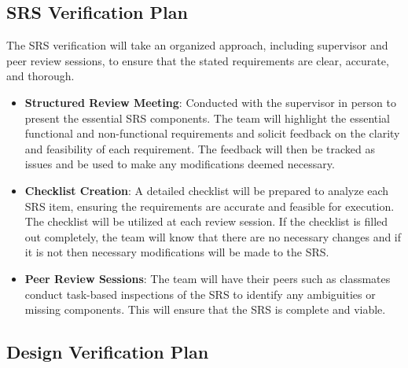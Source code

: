 \documentclass[12pt, titlepage]{article}
\begin{document}
\subsection{SRS Verification Plan}





\noindent The SRS verification will take an organized approach, including supervisor and peer review sessions, to ensure that the stated requirements are clear, accurate, and thorough. 

\begin{itemize}
    \item \textbf{Structured Review Meeting}: Conducted with the supervisor in person to present the essential SRS components. The team will highlight the essential functional and non-functional requirements and solicit feedback on the clarity and feasibility of each requirement. The feedback will then be tracked as issues and be used to make any modifications deemed necessary.
    \item \textbf{Checklist Creation}: A detailed checklist will be prepared to analyze each SRS item, ensuring the requirements are accurate and feasible for execution. The checklist will be utilized at each review session. If the checklist is filled out completely, the team will know that there are no necessary changes and if it is not then necessary modifications will be made to the SRS.
    \item \textbf{Peer Review Sessions}: The team will have their peers such as classmates conduct task-based inspections of the SRS to identify any ambiguities or missing components. This will ensure that the SRS is complete and viable. 
\end{itemize}

\subsection{Design Verification Plan}
\end{document}
